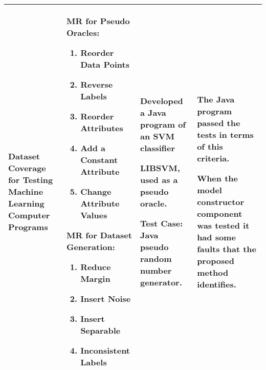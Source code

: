 \begin{singlespace}
\begin{longtable}[c]{| p{3cm} | p{5.5cm} | p{3cm} | p{3cm} |}
  \hline

  Dataset Coverage for Testing Machine Learning Computer Programs            &
  MR for Pseudo Oracles:
  \begin{enumerate}
   \item Reorder Data Points
   \item Reverse Labels
   \item Reorder Attributes
   \item Add a Constant Attribute
   \item Change Attribute Values
  \end{enumerate}
  \smallskip
  MR for Dataset Generation:
  \begin{enumerate}
   \item Reduce Margin
   \item Insert Noise
   \item Insert Separable
   \item Inconsistent Labels
  \end{enumerate}                                                  &
  Developed a Java program of an SVM classifier\par\medskip
  LIBSVM, used as a pseudo oracle.\par\medskip
  Test Case: Java pseudo random number generator.                            &
  The Java program passed the tests in terms of this criteria. \par\medskip
  When the model constructor component was tested it had some faults that the proposed method identifies.                      \\

  \hline


\end{longtable}
\end{singlespace}
